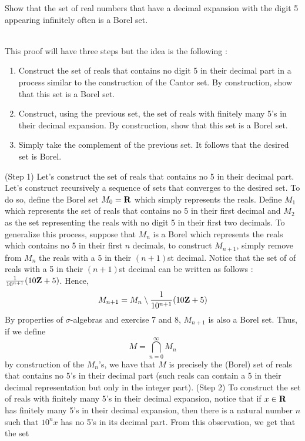 \begin{exercise}
    Show that the set of real numbers that have a decimal expansion with the digit 5 appearing infinitely often is a Borel set. \\
\end{exercise}

\begin{solution}
    \\ This proof will have three steps but the idea is the following : 
    \begin{enumerate}
        \item Construct the set of reals that contains no digit 5 in their decimal part in a process similar to the construction of the Cantor set. By construction, show that this set is a Borel set.
        \item Construct, using the previous set, the set of reals with finitely many 5's in their decimal expansion. By construction, show that this set is a Borel set.
        \item Simply take the complement of the previous set. It follows that the desired set is Borel.
    \end{enumerate}
    (Step 1) Let's construct the set of reals that contains no 5 in their decimal part. Let's construct recursively a sequence of sets that converges to the desired set. To do so, define the Borel set $M_0 = \mathbf{R}$ which simply represents the reals. Define $M_1$ which represents the set of reals that contains no 5 in their first decimal and $M_2$ as the set representing the reals with no digit 5 in their first two decimals. To generalize this process, suppose that $M_n$ is a Borel which represents the reals which contains no 5 in their first $n$ decimals, to construct $M_{n+1}$, simply remove from $M_n$ the reals with a 5 in their $(n+1)$st decimal. Notice that the set of of reals with a 5 in their $(n+1)$st decimal can be written as follows : $\frac{1}{10^{n+1}}(10\mathbf{Z} + 5)$. Hence,
    $$M_{n+1} = M_n \setminus \frac{1}{10^{n+1}}(10\mathbf{Z} + 5)$$
    By properties of $\sigma$-algebras and exercise 7 and 8, $M_{n+1}$ is also a Borel set. Thus, if we define 
    $$M = \bigcap_{n=0}^{\infty}M_n$$
    by construction of the $M_n$'s, we have that $M$ is precisely the (Borel) set of reals that contains no 5's in their decimal part (such reals can contain a 5 in their decimal representation but only in the integer part). \bigbreak
    \noindent (Step 2) To construct the set of reals with finitely many 5's in their decimal expansion, notice that if $x \in \mathbf{R}$ has finitely many 5's in their decimal expansion, then there is a natural number $n$ such that $10^n x$ has no 5's in its decimal part. From this observation, we get that the set

\end{solution}
